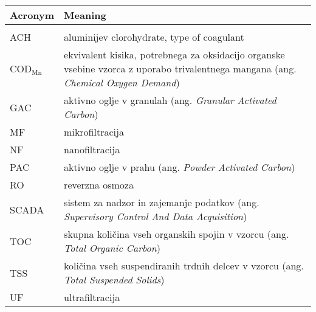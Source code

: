 \begin{longtable}[l]{@{}p{}@{}p{}@{}}
\hline
Acronym & Meaning\\
\hline
\endfirsthead
\hline
\endhead
&\\
ACH & aluminijev clorohydrate, type of coagulant\\
COD$_{\text{Mn}}$ & ekvivalent kisika, potrebnega za oksidacijo organske vsebine vzorca z uporabo trivalentnega mangana (ang. \emph{Chemical Oxygen Demand})\\
GAC & aktivno oglje v granulah (ang. \emph{Granular Activated Carbon})\\
MF & mikrofiltracija\\
NF & nanofiltracija\\
PAC & aktivno oglje v prahu (ang. \emph{Powder Activated Carbon})\\
RO & reverzna osmoza\\
SCADA & sistem za nadzor in zajemanje podatkov (ang. \emph{Supervisory Control And Data Acquisition})\\
TOC & skupna količina vseh organskih spojin v vzorcu (ang. \emph{Total Organic Carbon})\\
TSS & količina vseh suspendiranih trdnih delcev v vzorcu (ang. \emph{Total Suspended Solids})\\
UF & ultrafiltracija\\
\end{longtable}

\newpage

